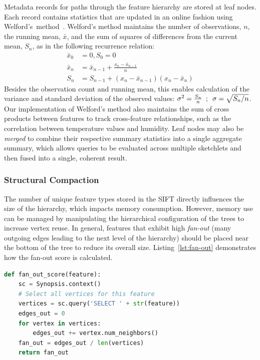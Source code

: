 Metadata records for paths through the feature hierarchy are stored at leaf nodes. Each record contains statistics that are updated in an online fashion using Welford's~method~\cite{welford1962note}. Welford's method maintains the number of observations, $n$, the running mean, $\bar{x}$, and the sum of squares of differences from the current mean, $S_n$, as in the following recurrence relation:
\begin{align*}
    \bar{x}_0 &= 0, S_0 = 0 \\
    \bar{x}_n &= \bar{x}_{n - 1} + \frac{x_n - \bar{x}_{n - 1}}{n} \\
    S_n       &= S_{n - 1} + (x_n - \bar{x}_{n - 1})(x_n - \bar{x}_n)
\end{align*}
Besides the observation count and running mean, this enables calculation of the variance and standard deviation of the observed values: $\sigma^2 = \frac{S_n}{n} \hspace{0.5em};\hspace{0.5em} \sigma = \sqrt{{S_n}/{n}}$. Our implementation of Welford's method also maintains the sum of cross products between features to track cross-feature relationships, such as the correlation between temperature values and humidity. Leaf nodes may also be \emph{merged} to combine their respective summary statistics into a single aggregate summary, which allows queries to be evaluated across multiple sketchlets and then fused into a single, coherent result.

\subsubsection{Structural Compaction}
The number of unique feature types stored in the SIFT directly influences the size of the hierarchy, which impacts memory consumption. However, memory use can be managed by manipulating the hierarchical configuration of the trees to increase vertex reuse.  In general, features that exhibit high \emph{fan-out} (many outgoing edges leading to the next level of the hierarchy) should be placed near the bottom of the tree to reduce its overall size. Listing~\ref{lst:fan-out} demonstrates how the fan-out score is calculated.

\begin{lstlisting}[language=Python,style=custompy,emph={fan_out_score,compact_hierarchy},caption={Calculation of the fan-out score (average number of outgoing edges) for dynamic reconfiguration.},label={lst:fan-out}]
def fan_out_score(feature):
    sc = Synopsis.context()
    # Select all vertices for this feature
    vertices = sc.query('SELECT ' + str(feature))
    edges_out = 0
    for vertex in vertices:
        edges_out += vertex.num_neighbors()
    fan_out = edges_out / len(vertices)
    return fan_out
\end{lstlisting}

